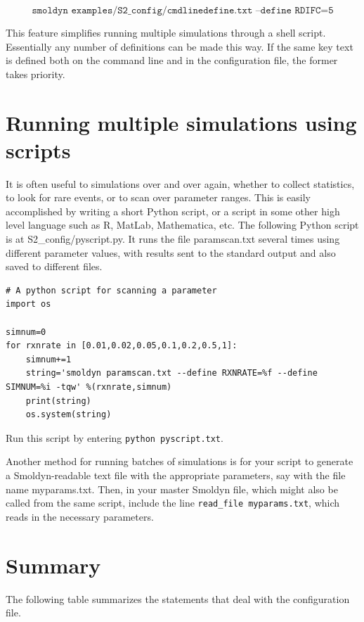 \documentclass {book}
\newcommand {\ttt} {\texttt}
\begin{document}
$$\ttt{smoldyn examples/S2\_config/cmdlinedefine.txt --define RDIFC=5}$$

This feature simplifies running multiple simulations through a shell script. Essentially any number of definitions can be made this way. If the same key text is defined both on the command line and in the configuration file, the former takes priority.

\section{Running multiple simulations using scripts}

It is often useful to simulations over and over again, whether to collect statistics, to look for rare events, or to scan over parameter ranges. This is easily accomplished by writing a short Python script, or a script in some other high level language such as R, MatLab, Mathematica, etc. The following Python script is at S2\_config/pyscript.py. It runs the file paramscan.txt several times using different parameter values, with results sent to the standard output and also saved to different files.

\begin{lstlisting}[style=SSAPython]
# A python script for scanning a parameter
import os

simnum=0
for rxnrate in [0.01,0.02,0.05,0.1,0.2,0.5,1]:
	simnum+=1
	string='smoldyn paramscan.txt --define RXNRATE=%f --define SIMNUM=%i -tqw' %(rxnrate,simnum)
	print(string)
	os.system(string)
\end{lstlisting}
Run this script by entering \ttt{python pyscript.txt}.

Another method for running batches of simulations is for your script to generate a Smoldyn-readable text file with the appropriate parameters, say with the file name myparams.txt. Then, in your master Smoldyn file, which might also be called from the same script, include the line \ttt{read\_file myparams.txt}, which reads in the necessary parameters.

\section{Summary}

The following table summarizes the statements that deal with the configuration file.
\end{document}

